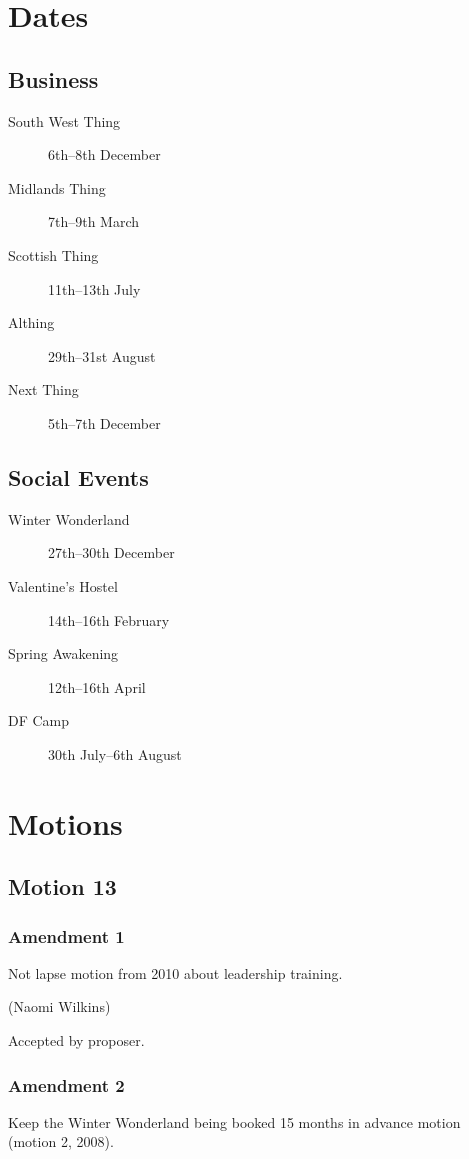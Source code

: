 \documentclass[a4paper, 11pt]{article} %
\begin{document}
\section{Dates}

\subsection{Business}
\begin{description}
\item[South West Thing] 6th--8th December
\item[Midlands Thing] 7th--9th March
\item[Scottish Thing] 11th--13th July
\item[Althing] 29th--31st August
\item[Next Thing] 5th--7th December
\end{description}

\subsection{Social Events}
\begin{description}
\item[Winter Wonderland] 27th--30th December
\item[Valentine's Hostel] 14th--16th February
\item[Spring Awakening] 12th--16th April
\item[DF Camp] 30th July--6th August
\end{description}

\section{Motions}
\subsection{Motion 13}
\subsubsection{Amendment 1}
Not lapse motion from 2010 about leadership training.

(Naomi Wilkins)

Accepted by proposer.

\subsubsection{Amendment 2}
Keep the Winter Wonderland being booked 15 months in advance motion (motion 2, 2008).
\end{document}
